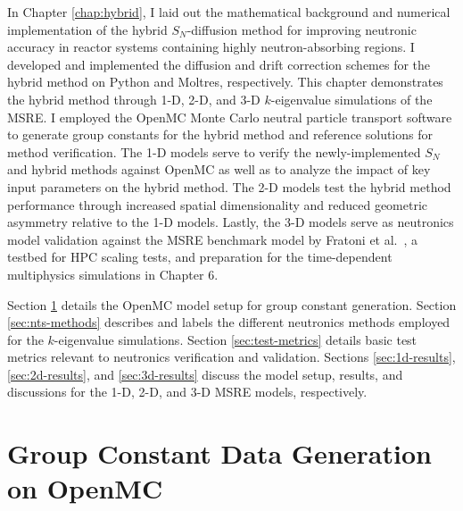 In Chapter \ref{chap:hybrid}, I laid out the mathematical background and numerical implementation
of the hybrid $S_N$-diffusion method for improving neutronic accuracy in reactor systems containing
highly neutron-absorbing regions. I developed and implemented the diffusion and drift correction
schemes for the hybrid method on Python and Moltres, respectively. This chapter demonstrates
the hybrid method through 1-D, 2-D, and 3-D $k$-eigenvalue simulations of the \gls{MSRE}.
I employed the OpenMC Monte Carlo neutral particle transport software \cite{romano_openmc:_2015} to
generate group constants for the hybrid method and reference solutions for method verification.
The 1-D models serve to verify the newly-implemented $S_N$ and hybrid methods
against OpenMC as well as to analyze the impact of key input parameters on the hybrid method. The
2-D models test the hybrid method performance through increased spatial dimensionality and reduced
geometric asymmetry relative to the 1-D models. Lastly, the 3-D models serve as neutronics model
validation against the \gls{MSRE} benchmark model by Fratoni et al.\ \cite{fratoni_molten_2020}, a
testbed for \gls{HPC} scaling tests, and preparation for the time-dependent multiphysics
simulations in Chapter 6.

Section \ref{sec:msre-gc} details the OpenMC model setup for group constant generation. Section
\ref{sec:nts-methods} describes and labels the different neutronics methods employed for the
$k$-eigenvalue simulations. Section \ref{sec:test-metrics} details basic test metrics relevant to
neutronics verification and validation. Sections \ref{sec:1d-results}, \ref{sec:2d-results}, and
\ref{sec:3d-results} discuss the model setup, results, and discussions for the 1-D, 2-D, and 3-D
\gls{MSRE} models, respectively.

\section{Group Constant Data Generation on OpenMC} \label{sec:msre-gc}

